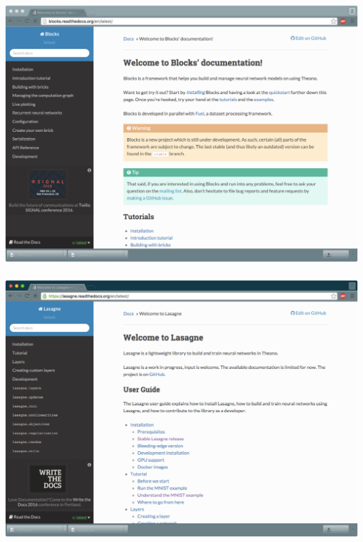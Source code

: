 \documentclass[xetex,mathserif,serif,aspectratio=169]{beamer}
\begin{document}
\begin{frame}[fragile] \frametitle{} \oldB \small

\includegraphics[width=\textwidth]{img/blocks.pdf}

\end{frame}

\begin{frame}[fragile] \frametitle{} \oldB \small

\includegraphics[width=\textwidth]{img/lasagna.pdf}

\end{frame}
\end{document}
